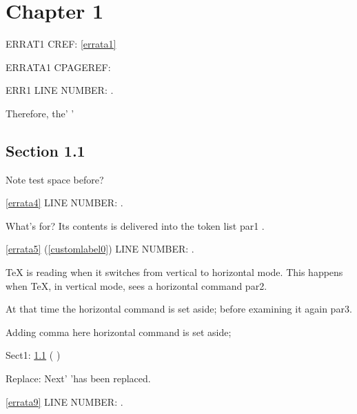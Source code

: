 \documentclass[a4paper,12pt]{report}
\makeatletter
\def\lineref#1{}
\newcommand{\getCurrentSectionNumber}{%
  \ifnum\c@section=0 %
  \thechapter
  \else
  \ifnum\c@subsection=0 %
  \thesection
  \else
  \ifnum\c@subsubsection=0 %
  \thesubsection
  \else
  \thesubsubsection
  \fi
  \fi
  \fi
}
\makeatother
\begin{document}

\chapter{Chapter 1}\label{chap-one}

\immediate{}%





ERRAT1 CREF: \cref{errata1}

ERRATA1 CPAGEREF: 

ERR1 LINE NUMBER: \lineref{erratalineno1}.


Therefore, the'
'

\section{Section 1.1}\label{sect-one}

Note test  space before?


\cref{errata4} LINE NUMBER: \lineref{erratalineno4}.

What's for? Its contents is delivered into the token list par1 .

\cref{errata5} (\cref{customlabel0}) LINE NUMBER: \lineref{erratalineno5}.

TeX is reading when it switches from vertical to horizontal mode.  This happens when TeX, in vertical mode, sees a horizontal command par2.

At that time the horizontal command is set aside;  before examining it again par3.



Adding comma here\erratumAdd{,} horizontal command is set aside;

Sect1: \cref{sect-one}  (\getCurrentSectionNumber)

Replace: Next'  'has been replaced.

\cref{errata9} LINE NUMBER: \lineref{erratalineno9}.
\end{document}
